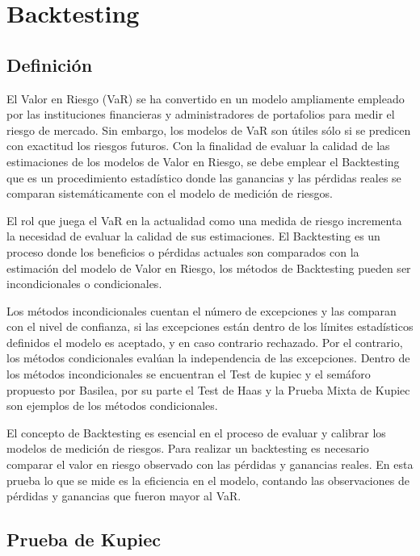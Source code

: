 \documentclass[
  12pt,
]{krantz}
\begin{document}
\mainmatter

\hypertarget{backtesting}{%
\chapter{Backtesting}\label{backtesting}}

\hypertarget{definicion-1}{%
\section{Definición}\label{definicion-1}}

El Valor en Riesgo (VaR) se ha convertido en un modelo ampliamente empleado por las instituciones financieras y administradores de portafolios para medir el riesgo de mercado. Sin embargo, los modelos de VaR son útiles sólo si se predicen con exactitud los riesgos futuros. Con la finalidad de evaluar la calidad de las estimaciones de los modelos de Valor en Riesgo, se debe emplear el Backtesting que es un procedimiento estadístico donde las ganancias y las pérdidas reales se comparan sistemáticamente con el modelo de medición de riesgos.

El rol que juega el VaR en la actualidad como una medida de riesgo incrementa la necesidad de evaluar la calidad de sus estimaciones. El Backtesting es un proceso donde los beneficios o pérdidas actuales son comparados con la estimación del modelo de Valor en Riesgo, los métodos de Backtesting pueden ser incondicionales o condicionales.

Los métodos incondicionales cuentan el número de excepciones y las comparan con el nivel de confianza, si las excepciones están dentro de los límites estadísticos definidos el modelo es aceptado, y en caso contrario rechazado. Por el contrario, los métodos condicionales evalúan la independencia de las excepciones. Dentro de los métodos incondicionales se encuentran el Test de kupiec y el semáforo propuesto por Basilea, por su parte el Test de Haas y la Prueba Mixta de Kupiec son ejemplos de los métodos condicionales.

El concepto de Backtesting es esencial en el proceso de evaluar y calibrar los modelos de medición de riesgos. Para realizar un backtesting es necesario comparar el valor en riesgo observado con las pérdidas y ganancias reales. En esta prueba lo que se mide es la eficiencia en el modelo, contando las observaciones de pérdidas y ganancias que fueron mayor al VaR.

\hypertarget{prueba-de-kupiec}{%
\section{Prueba de Kupiec}\label{prueba-de-kupiec}}
\end{document}
